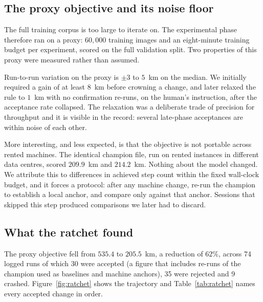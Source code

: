 \documentclass[11pt,a4paper]{article}
\begin{document}
\subsection{The proxy objective and its noise floor}

The full training corpus is too large to iterate on. The experimental phase therefore ran on
a proxy: $60{,}000$ training images and an eight-minute training budget per experiment,
scored on the full validation split. Two properties of this proxy were measured rather than
assumed.

Run-to-run variation on the proxy is $\pm 3$ to $5$~km on the median. We initially required a
gain of at least $8$~km before crowning a change, and later relaxed the rule to $1$~km with
no confirmation re-runs, on the human's instruction, after the acceptance rate collapsed. The
relaxation was a deliberate trade of precision for throughput and it is visible in the record:
several late-phase acceptances are within noise of each other.

More interesting, and less expected, is that the objective is not portable across rented
machines. The identical champion file, run on rented instances in different data centres,
scored $209.9$~km and $214.2$~km. Nothing about the model changed. We attribute this to
differences in achieved step count within the fixed wall-clock budget, and it forces a
protocol: after any machine change, re-run the champion to establish a local anchor, and
compare only against that anchor. Sessions that skipped this step produced comparisons we
later had to discard.

\subsection{What the ratchet found}

The proxy objective fell from $535.4$ to $205.5$~km, a reduction of $62\%$, across 74 logged
runs of which 30 were accepted (a figure that includes re-runs of the champion used as
baselines and machine anchors), 35 were rejected and 9 crashed. Figure~\ref{fig:ratchet}
shows the trajectory and Table~\ref{tab:ratchet} names every accepted change in order.
\end{document}
